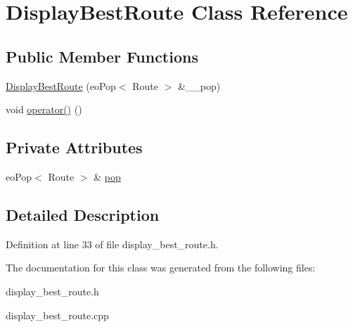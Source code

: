 \hypertarget{classDisplayBestRoute}{
\section{Display\-Best\-Route Class Reference}
\label{classDisplayBestRoute}
}
\subsection*{Public Member Functions}
\begin{CompactItemize}
\item 
\hypertarget{classDisplayBestRoute_db263e38f1e82174f811bf62f323f87f}{
\hyperlink{classDisplayBestRoute_db263e38f1e82174f811bf62f323f87f}{Display\-Best\-Route} (eo\-Pop$<$ Route $>$ \&\_\-\_\-pop)}
\label{classDisplayBestRoute_db263e38f1e82174f811bf62f323f87f}

\item 
\hypertarget{classDisplayBestRoute_ee879344a6d8b81a04d4eabbed2c7a04}{
void \hyperlink{classDisplayBestRoute_ee879344a6d8b81a04d4eabbed2c7a04}{operator()} ()}
\label{classDisplayBestRoute_ee879344a6d8b81a04d4eabbed2c7a04}

\end{CompactItemize}
\subsection*{Private Attributes}
\begin{CompactItemize}
\item 
\hypertarget{classDisplayBestRoute_5270aabbf294d2deca9878934216eb89}{
eo\-Pop$<$ Route $>$ \& \hyperlink{classDisplayBestRoute_5270aabbf294d2deca9878934216eb89}{pop}}
\label{classDisplayBestRoute_5270aabbf294d2deca9878934216eb89}

\end{CompactItemize}


\subsection{Detailed Description}




Definition at line 33 of file display\_\-best\_\-route.h.

The documentation for this class was generated from the following files:\begin{CompactItemize}
\item 
display\_\-best\_\-route.h\item 
display\_\-best\_\-route.cpp\end{CompactItemize}
